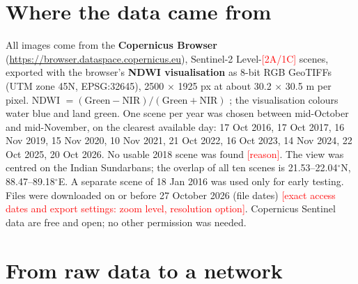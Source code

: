 \documentclass[11pt,a4paper]{article}
\newcommand{\todo}[1]{\textcolor{red}{[#1]}}
\begin{document}
\section{Where the data came from}

All images come from the \textbf{Copernicus Browser} (\url{https://browser.dataspace.copernicus.eu}), Sentinel-2 Level-\todo{2A/1C} scenes, exported with the browser's \textbf{NDWI visualisation} as 8-bit RGB GeoTIFFs (UTM zone 45N, EPSG:32645), 2500 $\times$ 1925 px at about 30.2 $\times$ 30.5 m per pixel. NDWI $= (\text{Green} - \text{NIR})/(\text{Green} + \text{NIR})$ \cite{mcfeeters1996}; the visualisation colours water blue and land green. One scene per year was chosen between mid-October and mid-November, on the clearest available day:
17 Oct 2016, 17 Oct 2017, 16 Nov 2019, 15 Nov 2020, 10 Nov 2021, 21 Oct 2022, 16 Oct 2023, 14 Nov 2024, 22 Oct 2025, 20 Oct 2026. No usable 2018 scene was found \todo{reason}. The view was centred on the Indian Sundarbans; the overlap of all ten scenes is 21.53--22.04$^\circ$N, 88.47--89.18$^\circ$E. A separate scene of 18 Jan 2016 was used only for early testing.
Files were downloaded on or before 27 October 2026 (file dates) \todo{exact access dates and export settings: zoom level, resolution option}. Copernicus Sentinel data are free and open; no other permission was needed.

\section{From raw data to a network}
\end{document}
